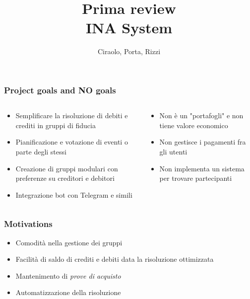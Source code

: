 \documentclass[11pt]{beamer}
\begin{document}
	\author{Ciraolo, Porta, Rizzi}
	\title{Prima review\\INA System}
	\begin{frame}[plain]
		\maketitle
	\end{frame}
	
	\begin{frame}
		\frametitle{Project goals and NO goals}
		
		\begin{columns}
			\begin{column}{.45\linewidth}
				\begin{itemize}
					\item Semplificare la risoluzione di debiti e crediti in gruppi di fiducia
					\item Pianificazione e votazione di eventi o parte degli stessi
					\item Creazione di gruppi modulari con preferenze su creditori e debitori
					\item Integrazione bot con Telegram e simili
				\end{itemize}
			\end{column}
			\begin{column}{.45\linewidth}
				\begin{itemize}
					\item Non è un "portafogli" e non tiene valore economico
					\item Non gestisce i pagamenti fra gli utenti
					\item Non implementa un sistema per trovare partecipanti
				\end{itemize}
			\end{column}
		\end{columns}
	\end{frame}

	\begin{frame}
		\frametitle{Motivations}
		
		\begin{itemize}
			\item Comodità nella gestione dei gruppi
			\item Facilità di saldo di crediti e debiti data la risoluzione ottimizzata
			\item Mantenimento di \textit{prove di acquisto}
			\item Automatizzazione della risoluzione
		\end{itemize}
	\end{frame}
\end{document}
